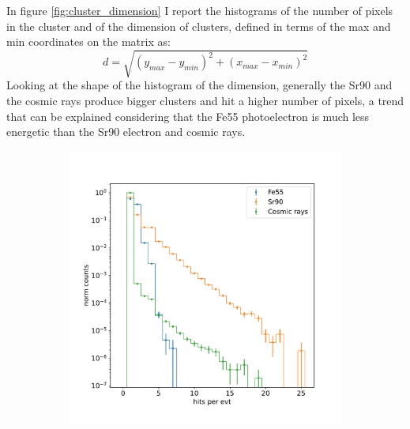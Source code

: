         In figure \ref{fig:cluster_dimension} I report the histograms of the number of pixels in the cluster and of the dimension of clusters, defined in terms of the max and min coordinates on the matrix as:
        \begin{equation}
            d = \sqrt{(y_{max}-y_{min})^2 + (x_{max}-x_{min})^2}
        \end{equation}\label{eq:cluster_dimension}
        Looking at the shape of the histogram of the dimension, generally the Sr90 and the cosmic rays produce bigger clusters and hit a higher number of pixels, a trend that can be explained considering that the Fe55 photoelectron is much less energetic than the Sr90 electron and cosmic rays. 
        \begin{figure}
            \centering
            \begin{subfigure}[b]{0.49\textwidth}
                \centering
                \includegraphics[width=\linewidth]{figures/charaterization/hits_per_evt.pdf}
                \caption{}
                \label{fighits_per_cluster:}
            \end{subfigure}
            \hfill
            \begin{subfigure}[b]{0.49\textwidth}
                \centering

\end{subfigure}
\end{figure}
